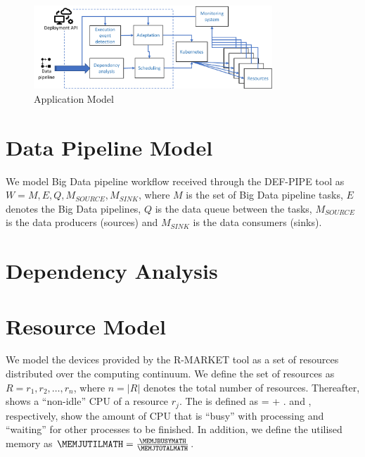     \begin{figure}
        \centering
        \includegraphics[width=0.8\textwidth]{pdf/data_cloud_arch.pdf}
        \caption{Application Model}
        \label{fig:application-model}
    \end{figure}
    

    \section{Data Pipeline Model}
    \label{sec:data-pipeline-model}

        We model Big Data pipeline workflow received through the DEF-PIPE tool as $W = M, E, Q, M_{SOURCE}, M_{SINK}$, where $M$ is the set of Big Data pipeline tasks, $E$ denotes the Big Data pipelines, $Q$ is the data queue between the tasks, $M_{SOURCE}$ is the data producers (sources) and $M_{SINK}$ is the data consumers (sinks).


    \section{Dependency Analysis}
    \label{sec:dependency-analysis-model}

    \section{Resource Model}
    \label{sec:resource-model}

        We model the devices provided by the R-MARKET tool as a set of resources distributed over the computing continuum. 
        We define the set of resources as $R = {r_1, r_2, \dots, r_n}$, where $n = | R |$ denotes the total number of resources. 
        Thereafter, \CPUJUTIL shows a “non-idle” CPU of a resource $r_j$. 
        The \CPUJUTIL  is defined as \CPUJUTIL  = \CPUJBUSY  + \CPUJWAIT. \CPUJBUSY  and  \CPUJWAIT, respectively, show the amount of CPU that is “busy” with processing and “waiting” for other processes to be finished. In addition, we define the utilised memory as $\MEMJUTILMATH = \frac{\MEMJBUSYMATH}{\MEMJTOTALMATH}$.


